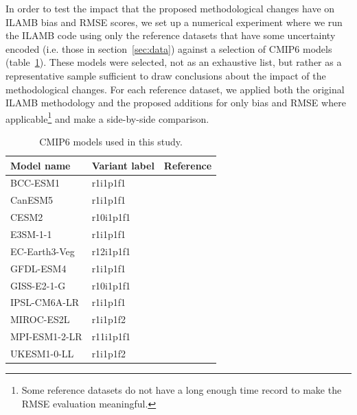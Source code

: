 \documentclass{agujournal}
\begin{document}
In order to test the impact that the proposed methodological changes have on ILAMB bias and RMSE scores, we set up a numerical experiment where we run the ILAMB code using only the reference datasets that have some uncertainty encoded (i.e. those in section~\ref{sec:data}) against a selection of CMIP6 models (table~\ref{t:cmip6}). These models were selected, not as an exhaustive list, but rather as a representative sample sufficient to draw conclusions about the impact of the methodological changes. For each reference dataset, we applied both the original ILAMB methodology and the proposed additions for only bias and RMSE where applicable\footnote{Some reference datasets do not have a long enough time record to make the RMSE evaluation meaningful.} and make a side-by-side comparison.
%
\begin{table}[ht]
	\caption{CMIP6 models used in this study.}\label{t:cmip6}
	\begin{tabular}{lll}
		\hline
		Model name    & Variant label & Reference                                                      \\
		\hline
		BCC-ESM1      & r1i1p1f1      & \cite{CMIP6.CMIP.BCC.BCC-ESM1.historical}                      \\
		CanESM5       & r1i1p1f1      & \cite{CMIP6.CMIP.CCCma.CanESM5.historical}                     \\
		CESM2         & r10i1p1f1     & \cite{CMIP6.CMIP.NCAR.CESM2.historical}                        \\
		E3SM-1-1      & r1i1p1f1      & \cite{CMIP6.CMIP.E3SM-Project.E3SM-1-1.historical}             \\
		EC-Earth3-Veg & r12i1p1f1     & \cite{CMIP6.CMIP.EC-Earth-Consortium.EC-Earth3-Veg.historical} \\
		GFDL-ESM4     & r1i1p1f1      & \cite{CMIP6.CMIP.NOAA-GFDL.GFDL-ESM4.historical}               \\
		GISS-E2-1-G   & r10i1p1f1     & \cite{CMIP6.CMIP.NASA-GISS.GISS-E2-1-G.historical}             \\
		IPSL-CM6A-LR  & r1i1p1f1      & \cite{CMIP6.CMIP.IPSL.IPSL-CM6A-LR.historical}                 \\
		MIROC-ES2L    & r1i1p1f2      & \cite{CMIP6.CMIP.MIROC.MIROC-ES2L.historical}                  \\
		MPI-ESM1-2-LR & r11i1p1f1     & \cite{CMIP6.CMIP.MPI-M.MPI-ESM1-2-LR.historical}               \\
		UKESM1-0-LL   & r1i1p1f2      & \cite{CMIP6.CMIP.MOHC.UKESM1-0-LL.historical}                  \\
		\hline
	\end{tabular}
\end{table}
\end{document}

